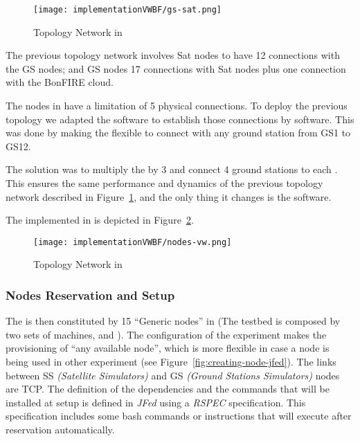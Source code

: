 \begin{figure}[!h]
\begin{center}
\texttt{[image: implementationVWBF/gs-sat.png]}

\caption{Topology Network in \vw}
\label{fig:impl-topology-vw}
\end{center}
\end{figure}



The previous topology network involves Sat nodes to have 12 connections with the GS nodes; and GS nodes 17 connections with Sat nodes plus one connection with the BonFIRE cloud.

The nodes in \vw have a limitation of 5 physical connections. To deploy the previous
topology we adapted the \sss software to establish those connections by software. This was
done by making the \satss flexible to connect with any ground station from GS1 to GS12. 

The solution was to multiply the \satss by 3 and connect 4 ground stations to each \satss. This ensures the same performance and dynamics of the previous topology network described in Figure~\ref{fig:impl-topology-vw}, and the only thing it changes is the software.

The \sss implemented in \vw is depicted in Figure~\ref{fig:impl-nodes-vw}.

\begin{figure}[!h]
\begin{center}
\texttt{[image: implementationVWBF/nodes-vw.png]}

\caption{Topology Network in \vw}
\label{fig:impl-nodes-vw}
\end{center}
\end{figure}



\subsubsection{Nodes Reservation and Setup}

The \sss is then constituted by 15 ``Generic nodes'' in  (The \vw
testbed is composed by two sets of machines,  and ). The configuration of the experiment makes the provisioning of ``any available node'',
which is more flexible in case a node is being used in other experiment (see Figure~\ref{fig:creating-node-jfed}). The links between SS \emph{(Satellite Simulators)} and GS \emph{(Ground Stations Simulators)} nodes
are \ac{TCP}. The definition of the dependencies and the commands that will be installed at
setup is defined in \emph{JFed} using a \emph{RSPEC} specification. This specification includes some
bash commands or instructions that will execute after reservation automatically.


